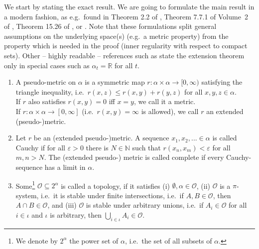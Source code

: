 \documentclass[lean]{DraftAFM}
\begin{document}
We start by stating the exact result. We are going to formulate the main result in a modern fashion, as e.g.\ found in Theorem 2.2 of \cite{rao1971projective}, Theorem 7.7.1 of Volume~2 of \cite{bogachev2007measure}, Theorem 15.26 of \cite{guide2006infinite}, or \cite{border1998expository}. Note that these formulations split general assumptions on the underlying space(s) (e.g.\ a metric property) from the property which is needed in the proof (inner regularity with respect to compact sets). Other -- highly readable -- references such as \cite{Billingsley1995} state the extension theorem only in special cases such as $\alpha_t = \mathbb R$ for all $t$.


\begin{definition}
  \begin{enumerate}
  \item \sloppy A pseudo-metric on $\alpha$ is a symmetric map $r : \alpha
    \times \alpha \to [0,\infty)$ satisfying the triangle inequality,
      i.e.\ $r(x,z) \leq r(x,y) + r(y,z)$ for all $x,y,z\in\alpha$.
      \\ If $r$ also satisfies $r(x,y) = 0$ iff $x=y$, we call it a
      metric.  \\ If $r : \alpha \times \alpha \to [0,\infty]$
      (i.e.\ $r(x,y) = \infty$ is allowed), we call $r$ an extended
      (pseudo-)metric.
    \item Let $r$ be an (extended pseudo-)metric. A sequence $x_1,
      x_2,... \in \alpha$ is called Cauchy if for all $\varepsilon>0$
      there is $N\in\mathbb N$ such that $r(x_n, x_m) < \varepsilon$
      for all $m,n > N$. The (extended pseudo-) metric is called
      complete if every Cauchy-sequence has a limit in
      $\alpha$.
    \item Some\footnote{We denote by $2^\alpha$ the power set of
      $\alpha$, i.e.\ the set of all subsets of $\alpha$.} $\mathcal O
      \subseteq 2^\alpha$ is called a topology, if it satisfies (i)
      $\emptyset, \alpha \in \mathcal O$, (ii) $\mathcal O$ is a
      $\pi$-system, i.e.\ it is stable under finite intersections,
      i.e.\ if $A, B \in \mathcal O$, then $A \cap B \in \mathcal O$,
      and (iii) $\mathcal O$ is stable under arbitrary unions,
      i.e.\ if $A_i \in \mathcal O$ for all $i\in\iota$ and $\iota$ is
      arbitrary, then $\bigcup_{i\in \iota} A_i \in \mathcal O$.
  \end{enumerate}
\end{definition}
\end{document}
